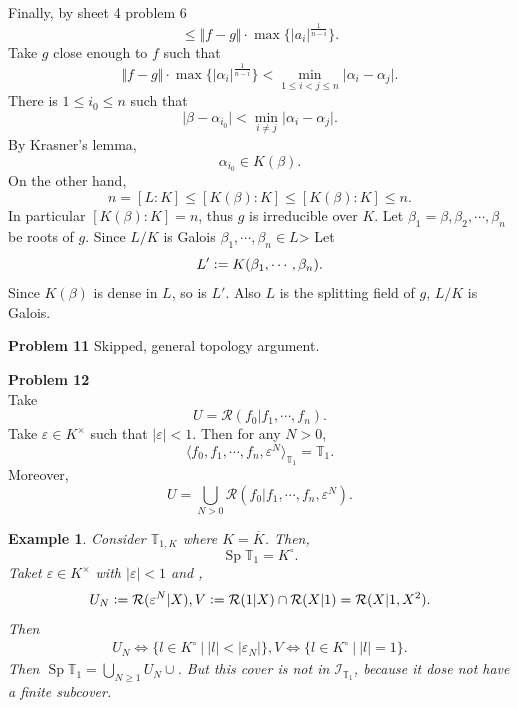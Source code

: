 \documentclass[10pt]{article}
\newtheorem{example}{Example}[section]
\DeclareMathOperator{\Sp}{Sp}
\newcommand{\defeq}{\vcentcolon=}
\newcommand{\norm}[1]{\Vert #1 \Vert}
\newcommand{\T}[0]{\mathbb{T}}
\newcommand{\sep}[0]{\:|\:}
\newcommand{\ab}[1]{\vert #1 \vert}
\begin{document}
Finally, by sheet 4 problem 6
\begin{equation*}
    \leq \norm{f-g}\cdot\max\{\ab{a_i}^{{\frac 1 {n-i}}}\}.
\end{equation*}
Take $g$ close enough to $f$ such that 
\begin{equation*}
    \norm{f-g}\cdot\max\{\ab{\alpha_i}^{{\frac 1 {n-i}}}\}<\min_{1\leq i<j\leq n}\ab{\alpha_i-\alpha_j}.
\end{equation*}
There is $1\leq i_0\leq n$ such that 
\begin{equation*}
    \ab{\beta-\alpha_{i_0}}<\min_{i\not=j}\ab{\alpha_i-\alpha_j}.
\end{equation*}
By Krasner's lemma,
\begin{equation*}
    \alpha_{i_0}\in K(\beta).
\end{equation*}
On the other hand,
\begin{equation*}
    n = [L:K]\leq [K(\beta):K]\leq [K(\beta):K]\leq n.
\end{equation*}
In particular $[K(\beta):K]=n$, thus $g$ is irreducible over $K$. Let $\beta_1=\beta,\beta_2,\cdots,\beta_n$ be roots of $g$. Since $L/K$ is Galois $\beta_1,\cdots,\beta_n\in L$> Let 
\begin{equation*}
    L'\defeq K(\beta_1,\cdots,\beta_n).
\end{equation*}
Since $K(\beta)$ is dense in $L$, so is $L'$. Also $L$ is the splitting field of $g$, $L/K$ is Galois. 
\par\textbf{Problem 11} Skipped, general topology argument.
\par\textbf{Problem 12}\\
Take 
\begin{equation*}
    U = \mathcal{R}(f_0|f_1,\cdots,f_n).
\end{equation*}
Take $\varepsilon\in K^\times$ such that $\ab{\varepsilon}<1$. Then for any $N>0$, 
\begin{equation*}
    \langle f_0,f_1,\cdots,f_n,\varepsilon^N\rangle_{\T_1} = \T_1.
\end{equation*}
Moreover,
\begin{equation*}
    U = \bigcup_{N>0} \mathcal{R}(f_0|f_1,\cdots,f_n,\varepsilon^N).
\end{equation*}
\begin{example}
    Consider $\T_{1,K}$ where $K=\overline{K}$. Then,
    \begin{equation*}
        \Sp\T_1 = K^\circ.
    \end{equation*}
    Taket $\varepsilon\in K^\times $ with $\ab{\varepsilon}<1$ and ,
    \begin{align*}
        U_N \defeq \mathcal{R}(\varepsilon^N|X), V\defeq \mathcal{R}(1|X)\cap\mathcal{R}(X|1) = \mathcal{R}(X|1,X^2).
    \end{align*}
    Then 
    \begin{align*}
        U_N\Leftrightarrow\{l\in K^\circ\sep \ab{l}<\ab{\varepsilon_N}\}, V\Leftrightarrow \{l\in K^\circ\sep \ab{l}=1\}.
    \end{align*}
    Then $\Sp\T_1 = \bigcup_{N\geq 1}U_N\cup $. But this cover is not in $\mathcal{I}_{\T_1}$, because it dose not have a finite subcover.
\end{example}
\end{document}
